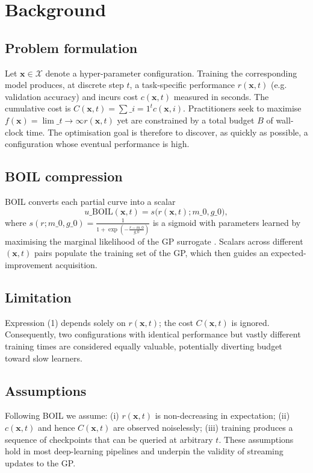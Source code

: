 \documentclass{article} %
\begin{document}
\section{Background}
\label{sec:background}
\subsection{Problem formulation}
Let \(\mathbf{x} \in \mathcal{X}\) denote a hyper-parameter configuration. Training the corresponding model produces, at discrete step \(t\), a task-specific performance \(r(\mathbf{x}, t)\) (e.g. validation accuracy) and incurs cost \(c(\mathbf{x}, t)\) measured in seconds. The cumulative cost is \(C(\mathbf{x}, t) = \sum\limits\_{i=1}^{t} c(\mathbf{x}, i)\). Practitioners seek to maximise \(f(\mathbf{x}) = \lim\limits\_{t \to \infty} r(\mathbf{x}, t)\) yet are constrained by a total budget \(B\) of wall-clock time. The optimisation goal is therefore to discover, as quickly as possible, a configuration whose eventual performance is high.

\subsection{BOIL compression}
BOIL converts each partial curve into a scalar
\begin{equation}\tag{1}
  u\_{\mathrm{BOIL}}(\mathbf{x}, t) = s\big(r(\mathbf{x}, t); m\_0, g\_0\big),
\end{equation}
where \(s(r; m\_0, g\_0) = \frac{1}{1 + \exp\!\left(-\frac{r - m\_0}{g\_0}\right)}\) is a sigmoid with parameters learned by maximising the marginal likelihood of the GP surrogate \cite{nguyen-2019-bayesian}. Scalars across different \((\mathbf{x}, t)\) pairs populate the training set of the GP, which then guides an expected-improvement acquisition.

\subsection{Limitation}
Expression (1) depends solely on \(r(\mathbf{x}, t)\); the cost \(C(\mathbf{x}, t)\) is ignored. Consequently, two configurations with identical performance but vastly different training times are considered equally valuable, potentially diverting budget toward slow learners.

\subsection{Assumptions}
Following BOIL we assume: (i) \(r(\mathbf{x}, t)\) is non-decreasing in expectation; (ii) \(c(\mathbf{x}, t)\) and hence \(C(\mathbf{x}, t)\) are observed noiselessly; (iii) training produces a sequence of checkpoints that can be queried at arbitrary \(t\). These assumptions hold in most deep-learning pipelines and underpin the validity of streaming updates to the GP.
\end{document}
